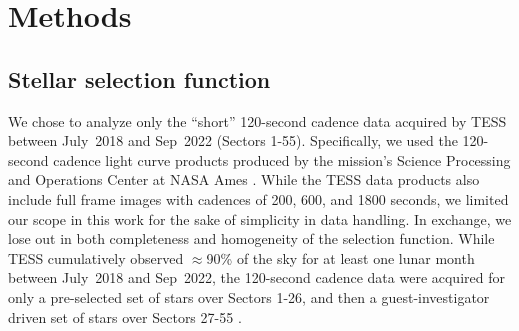 \documentclass[11pt,twocolumn,tighten]{aastex63}
\begin{document}
\section{Methods}
\label{sec:methods}


\subsection{Stellar selection function}
\label{subsec:selectionfn}

We chose to analyze only the ``short'' 120-second cadence data
acquired by TESS between July~2018 and Sep~2022 (Sectors 1-55).
Specifically, we used the 120-second cadence light curve products
produced by the mission's Science Processing and Operations Center at
NASA Ames \citep{2016SPIE.9913E..3EJ}.  While the TESS data products
also include full frame images with cadences of 200, 600, and 1800
seconds, we limited our scope in this work for the sake of simplicity
in data handling.  In exchange, we lose out in both completeness and
homogeneity of the selection function.  While TESS cumulatively
observed $\approx$90\% of the sky for at least one lunar month between
July~2018 and Sep~2022, the 120-second cadence data were acquired for
only a pre-selected set of stars over Sectors 1-26, and then a
guest-investigator driven set of stars over Sectors 27-55
\citep{2021PASP..133i5002F}.
\end{document}
